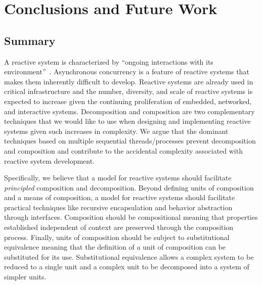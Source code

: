 \chapter{Conclusions and Future Work}
\label{conclusion}

\section{Summary}

A reactive system is characterized by ``ongoing interactions with its environment''~\cite{manna1992temporal}.
Asynchronous concurrency is a feature of reactive systems that makes them inherently difficult to develop.
Reactive systems are already used in critical infrastructure and the number, diversity, and scale of reactive systems is expected to increase given the continuing proliferation of embedded, networked, and interactive systems.
Decomposition and composition are two complementary techniques that we would like to use when designing and implementing reactive systems given such increases in complexity.
We argue that the dominant techniques based on multiple sequential threads/processes prevent decomposition and composition and contribute to the accidental complexity associated with reactive system development.

Specifically, we believe that a model for reactive systems should facilitate \emph{principled} composition and decomposition.
Beyond defining units of composition and a means of composition, a model for reactive systems should facilitate practical techniques like recursive encapsulation and behavior abstraction through interfaces.
Composition should be compositional meaning that properties established independent of context are preserved through the composition process.
Finally, units of composition should be subject to substitutional equivalence meaning that the definition of a unit of composition can be substituted for its use.
Substitutional equivalence allows a complex system to be reduced to a single unit and a complex unit to be decomposed into a system of simpler units.

